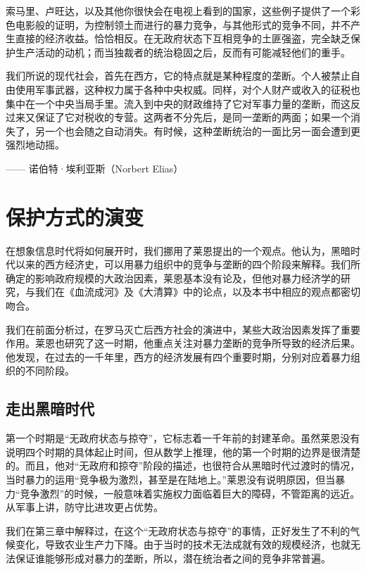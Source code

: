 索马里、卢旺达，以及其他你很快会在电视上看到的国家，这些例子提供了一个彩色电影般的证明，为控制领土而进行的暴力竞争，与其他形式的竞争不同，并不产生直接的经济收益。恰恰相反。在无政府状态下互相竞争的土匪强盗，完全缺乏保护生产活动的动机；而当独裁者的统治稳固之后，反而有可能减轻他们的重手。

\begin{tcolorbox}
\kaishu 我们所说的现代社会，首先在西方，它的特点就是某种程度的垄断。个人被禁止自由使用军事武器，这种权力属于各种中央权威。同样，对个人财产或收入的征税也集中在一个中央当局手里。流入到中央的财政维持了它对军事力量的垄断，而这反过来又保证了它对税收的专营。这两者不分先后，是同一垄断的两面；如果一个消失了，另一个也会随之自动消失。有时候，这种垄断统治的一面比另一面会遭到更强烈地动摇。
\begin{flushright}
—— 诺伯特·埃利亚斯（Norbert Elias）
\end{flushright}
\end{tcolorbox}

\section{保护方式的演变}
在想象信息时代将如何展开时，我们挪用了莱恩提出的一个观点。他认为，黑暗时代以来的西方经济史，可以用暴力组织中的竞争与垄断的四个阶段来解释。我们所确定的影响政府规模的大政治因素，莱恩基本没有论及，但他对暴力经济学的研究，与我们在《血流成河》及《大清算》中的论点，以及本书中相应的观点都密切吻合。

我们在前面分析过，在罗马灭亡后西方社会的演进中，某些大政治因素发挥了重要作用。莱恩也研究了这一时期，他重点关注对暴力垄断的竞争所导致的经济后果。他发现，在过去的一千年里，西方的经济发展有四个重要时期，分别对应着暴力组织的不同阶段。

\subsection{走出黑暗时代}
第一个时期是“无政府状态与掠夺”，它标志着一千年前的封建革命。虽然莱恩没有说明四个时期的具体起止时间，但从数学上推理，他的第一个时期的边界是很清楚的。而且，他对“无政府和掠夺”阶段的描述，也很符合从黑暗时代过渡时的情况，当时暴力的运用“竞争极为激烈，甚至是在陆地上。”莱恩没有说明原因，但当暴力“竞争激烈”的时候，一般意味着实施权力面临着巨大的障碍，不管距离的远近。从军事上讲，防守比进攻更占优势。

我们在第三章中解释过，在这个“无政府状态与掠夺”的事情，正好发生了不利的气候变化，导致农业生产力下降。由于当时的技术无法成就有效的规模经济，也就无法保证谁能够形成对暴力的垄断，所以，潜在统治者之间的竞争非常普遍。

